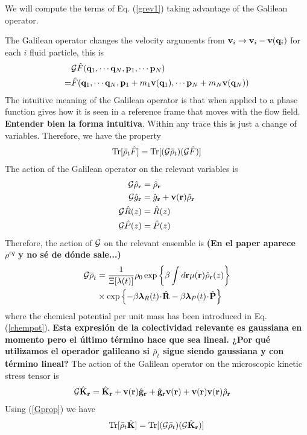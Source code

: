 \documentclass[b5paper,openright,11pt]{book}
\newcommand{\esc}{\!\cdot\!}
\newcommand{\Note}[1]{{\bf \color{red}#1}}    %
\begin{document}
We will compute the terms of Eq. (\ref{grev1}) taking advantage of the Galilean operator. 


The Galilean operator changes the velocity arguments from ${\bf v}_i\to {\bf v}_i-{\bf v}({\bf q}_i)$ for each $i$ fluid particle, this is
\begin{align}
&  {\cal G}\hat{F}({\bf q}_1,\cdots{\bf q}_N,{\bf p}_1,\cdots{\bf p}_N)
\nonumber\\
=&\hat{F}({\bf q}_1,\cdots{\bf q}_N,{\bf p}_1+m_1{\bf v}({\bf q}_1),\cdots{\bf p}_N+m_N{\bf v}({\bf q}_N))
\end{align}
The intuitive meaning of the Galilean operator is that when applied to a phase function gives how it is seen in a reference frame that moves with the flow field. \Note{Entender bien la forma intuitiva}. Within any trace this is just a change of variables. Therefore, we have the property
\begin{align}
  {\rm Tr}[\bar{\rho}_t\hat{F}] &= {\rm Tr}[({\cal G}\bar{\rho}_t)({\cal G}\hat{F})] \nonumber \\
  \label{Gprop}
\end{align}
The action of the Galilean operator on the relevant variables is
\begin{align}
  {\cal G}\hat{\rho}_{\bf r} &= \hat{\rho}_{\bf r} \nonumber\\
  {\cal G}\hat{g}_{\bf r} &= \hat{g}_{\bf r} + {\bf v}({\bf r})\hat{\rho}_{\bf r} \nonumber \\
  {\cal G}\hat{R}(z) &= \hat{R}(z) \nonumber\\
  {\cal G}\hat{P}(z) &= \hat{P}(z)
\end{align}
Therefore, the action of ${\cal G}$ on the relevant ensemble is \Note{(En el paper aparece $\rho^{eq}$ y no sé de dónde sale...)}
\begin{align}
  {\cal G}\overline{\rho}_t &=
\frac{1}{\Xi[\lambda(t)]}\rho_0
\exp\left\{\beta\int d{\bf r}\mu({\bf r})\hat{\rho}_{\bf r}(z)\right\}
\nonumber\\
&\times
\exp\left\{-\beta \boldsymbol{\lambda}_{R}(t)\esc\hat{\bf R}
-\beta \boldsymbol{\lambda}_{P}(t)\esc\hat{\bf P}\right\}
\label{resrelens}
\end{align}
where  the chemical  potential per  unit mass  has been  introduced in
Eq.  (\ref{chempot}).  \Note{Esta expresión de la colectividad relevante es gaussiana en momento pero el último término hace que sea lineal. ¿Por qué utilizamos el operador galileano si $\bar{\rho}_t$ sigue siendo gaussiana y con término lineal?}
The  action  of the  Galilean  operator on  the
microscopic kinetic stress tensor is
\begin{align}
  {\cal G}\hat{{\bf K}}_{\bf r} &=
\hat{{\bf K}}_{\bf r} 
+{\bf v}({\bf r})\hat{\bf g}_{\bf r}
+\hat{\bf g}_{\bf r}{\bf v}({\bf r})
+{\bf v}({\bf r}){\bf v}({\bf r})\hat{\rho}_{\bf r}
\end{align}
Using (\ref{Gprop}) we have
\begin{align}
  {\rm Tr}[\bar{\rho}_t\hat{{\bf K}}]={\rm Tr}[({\cal G}\bar{\rho}_t)({\cal G}\hat{{\bf K}}_{\bf r})]
\end{align}
\end{document}
